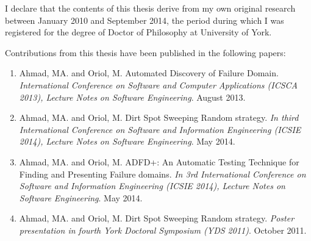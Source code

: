 \begin{declaration}

I declare that the contents of this thesis derive from my own original research between January 2010 and September 2014, the period during which I was registered for the degree of Doctor of Philosophy at University of York.

Contributions from this thesis have been published in the following papers: 

\begin{enumerate}

\item Ahmad, MA. and Oriol, M. Automated Discovery of Failure Domain. \textit{International Conference on Software and Computer Applications (ICSCA 2013), Lecture Notes on Software Engineering}. August 2013.

\item Ahmad, MA. and Oriol, M. Dirt Spot Sweeping Random strategy. \textit{In third International Conference on Software and Information Engineering (ICSIE 2014), Lecture Notes on Software Engineering}. May 2014.

\item Ahmad, MA. and Oriol, M. ADFD+: An Automatic Testing Technique for Finding and Presenting Failure domains. \textit{In 3rd International Conference on Software and Information Engineering (ICSIE 2014), Lecture Notes on Software Engineering}. May 2014.

\item Ahmad, MA. and Oriol, M. Dirt Spot Sweeping Random strategy. \textit{Poster presentation in fourth York Doctoral Symposium (YDS 2011)}. October 2011.

\end{enumerate}

\end{declaration}